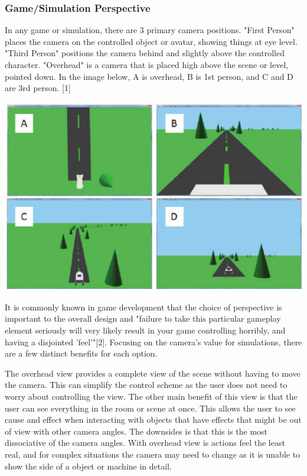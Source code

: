 \documentclass[onecolumn, draftclsnofoot,10pt, compsoc]{IEEEtran}
\newcounter{subsubsubsection}[subsubsection]
\begin{document}
\subsubsection{Game/Simulation Perspective}
In any game or simulation, there are 3 primary camera positions. "First Person" places the camera on the controlled object or avatar, showing things at eye level. "Third Person" positions the camera behind and slightly above the controlled character. "Overhead" is a camera that is placed high above the scene or level, pointed down. In the image below, A is overhead, B is 1st person, and C and D are 3rd person. [1] 

\includegraphics[width=\textwidth]{13o.png}

It is commonly known in game development that the choice of perspective is important to the overall design and "failure to take this particular gameplay element seriously will very likely result in your game controlling horribly, and having a disjointed 'feel'"[2]. Focusing on the camera's value for simulations, there are a few distinct benefits for each option. 

The overhead view provides a complete view of the scene without having to move the camera. This can simplify the control scheme as the user does not need to worry about controlling the view. The other main benefit of this view is that the user can see everything in the room or scene at once. This allows the user to see cause and effect when interacting with objects that have effects that might be out of view with other camera angles. The downsides is that this is the most dissociative of the camera angles. With overhead view is actions feel the least real, and for complex situations the camera may need to change as it is unable to show the side of a object or machine in detail.
\end{document}
